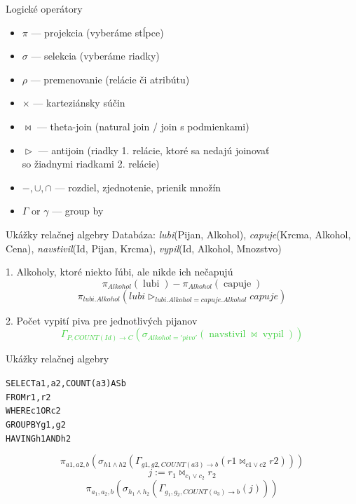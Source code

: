 \documentclass[12pt]{beamer}
\def\blue#1{\textcolor{Cerulean}{#1}}
\def\green#1{\textcolor{LimeGreen}{#1}}
\DeclareMathOperator{\join}{\bowtie}
\DeclareMathOperator{\antijoin}{\rhd}
\DeclareMathOperator{\lubi}{lubi}
\DeclareMathOperator{\capuje}{capuje}
\DeclareMathOperator{\navstivil}{navstivil}
\DeclareMathOperator{\vypil}{vypil}
\begin{document}
\begin{frame}[fragile]{Logické operátory}
\begin{itemize}
    \item $\pi$ --- projekcia (vyberáme stĺpce)
    \item $\sigma$ --- selekcia (vyberáme riadky)
    \item $\rho$ --- premenovanie (relácie či atribútu)
    \item $\times$ --- karteziánsky súčin
    \item $\bowtie$ --- theta-join (natural join / join s podmienkami)
    \item $\antijoin$ --- antijoin (riadky 1. relácie, ktoré sa nedajú joinovať\\ \hskip 2.5cm so žiadnymi riadkami 2. relácie)
    \item $-, \cup, \cap$ --- rozdiel, zjednotenie, prienik množín
    \item $\Gamma$ or $\gamma$ --- group by
\end{itemize}
\end{frame}

\begin{frame}[fragile]{Ukážky relačnej algebry}
Databáza: \emph{lubi}(Pijan, Alkohol), \emph{capuje}(Krcma, Alkohol, Cena),
\emph{navstivil}(Id, Pijan, Krcma), \emph{vypil}(Id, Alkohol, Mnozstvo)

\bigskip

1. Alkoholy, ktoré niekto ľúbi, ale nikde ich nečapujú
\blue{
$$
    \pi_{Alkohol} (\lubi) - \pi_{Alkohol}(\capuje)
$$
$$
    \pi_{lubi.Alkohol} (lubi\antijoin_{lubi.Alkohol = capuje.Alkohol} capuje)
$$
}

2. Počet vypití piva pre jednotlivých pijanov
\green{
$$
    \Gamma_{P, COUNT(Id)\rightarrow C}(\sigma_{Alkohol='pivo'}(\navstivil\join\vypil))
$$
}
\end{frame}

\begin{frame}[fragile]{Ukážky relačnej algebry}
\begin{alltt}
SELECT a1, a2, COUNT(a3) AS b
FROM r1, r2
WHERE c1 OR c2
GROUP BY g1, g2
HAVING h1 AND h2
\end{alltt}
$$
    \pi_{a1, a2, b}(\sigma_{h1\land h2}(\Gamma_{g1, g2, COUNT(a3)\rightarrow b} (r1\bowtie_{c1 \lor c2} r2)))
$$
\bigskip
$$j := r_1\bowtie_{c_1 \lor c_2} r_2$$
$$\pi_{a_1, a_2, b}(\sigma_{h_1\land h_2}(\Gamma_{g_1, g_2, COUNT(a_3)\rightarrow b} (j)))$$
\end{frame}
\end{document}
